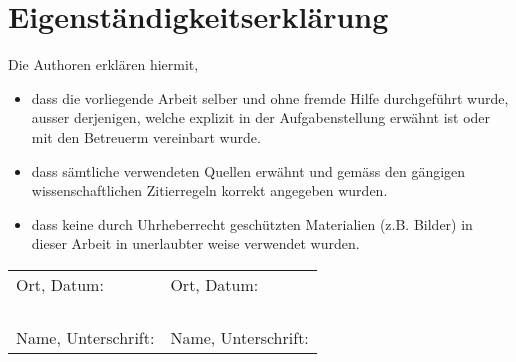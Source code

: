 \documentclass[]{subfiles}
\begin{document}
\section{Eigenständigkeitserklärung}
    Die Authoren erklären hiermit,
    \begin{itemize}
        \item dass die vorliegende Arbeit selber und ohne fremde Hilfe durchgeführt wurde,
        ausser derjenigen, welche explizit in der Aufgabenstellung erwähnt ist oder mit den Betreuerm vereinbart wurde.
        \item dass sämtliche verwendeten Quellen erwähnt und gemäss den gängigen wissenschaftlichen Zitierregeln korrekt angegeben wurden.
        \item dass keine durch Uhrheberrecht geschützten Materialien (z.B. Bilder) in dieser Arbeit in unerlaubter weise verwendet wurden.
        \newline
        \newline
        \newline
        \newline
    \end{itemize}
    
    \begin{tabularx}{\textwidth}{XX}
        Ort, Datum: & Ort, Datum: \\
        & \\
        & \\
        & \\
        & \\
        Name, Unterschrift: & Name, Unterschrift: \\
    \end{tabularx}
    
\end{document}
